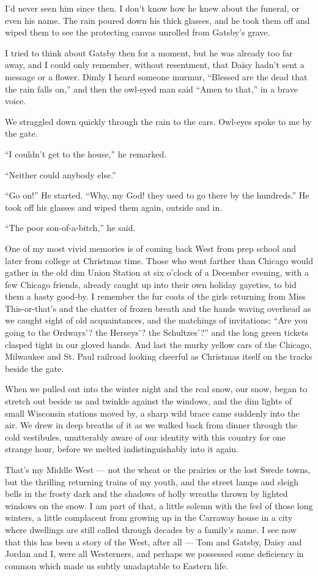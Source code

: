 \documentclass{znotebook}
\begin{document}
I’d never seen him since then. I don’t know how he knew about the funeral, or even his name. The rain poured down his thick glasses, and he took them off and wiped them to see the protecting canvas unrolled from Gatsby’s grave.

I tried to think about Gatsby then for a moment, but he was already too far away, and I could only remember, without resentment, that Daisy hadn’t sent a message or a flower. Dimly I heard someone murmur, ``Blessed are the dead that the rain falls on,'' and then the owl-eyed man said ``Amen to that,'' in a brave voice.

We straggled down quickly through the rain to the cars. Owl-eyes spoke to me by the gate.

``I couldn’t get to the house,'' he remarked.

``Neither could anybody else.''

``Go on!'' He started. ``Why, my God! they used to go there by the hundreds.'' He took off his glasses and wiped them again, outside and in.

``The poor son-of-a-bitch,'' he said.

One of my most vivid memories is of coming back West from prep school and later from college at Christmas time. Those who went farther than Chicago would gather in the old dim Union Station at six o’clock of a December evening, with a few Chicago friends, already caught up into their own holiday gayeties, to bid them a hasty good-by. I remember the fur coats of the girls returning from Miss This-or-that’s and the chatter of frozen breath and the hands waving overhead as we caught sight of old acquaintances, and the matchings of invitations: ``Are you going to the Ordways’? the Herseys’? the Schultzes’?'' and the long green tickets clasped tight in our gloved hands. And last the murky yellow cars of the Chicago, Milwaukee and St. Paul railroad looking cheerful as Christmas itself on the tracks beside the gate.

When we pulled out into the winter night and the real snow, our snow, began to stretch out beside us and twinkle against the windows, and the dim lights of small Wisconsin stations moved by, a sharp wild brace came suddenly into the air. We drew in deep breaths of it as we walked back from dinner through the cold vestibules, unutterably aware of our identity with this country for one strange hour, before we melted indistinguishably into it again.

That’s my Middle West — not the wheat or the prairies or the lost Swede towns, but the thrilling returning trains of my youth, and the street lamps and sleigh bells in the frosty dark and the shadows of holly wreaths thrown by lighted windows on the snow. I am part of that, a little solemn with the feel of those long winters, a little complacent from growing up in the Carraway house in a city where dwellings are still called through decades by a family’s name. I see now that this has been a story of the West, after all — Tom and Gatsby, Daisy and Jordan and I, were all Westerners, and perhaps we possessed some deficiency in common which made us subtly unadaptable to Eastern life.
\end{document}
